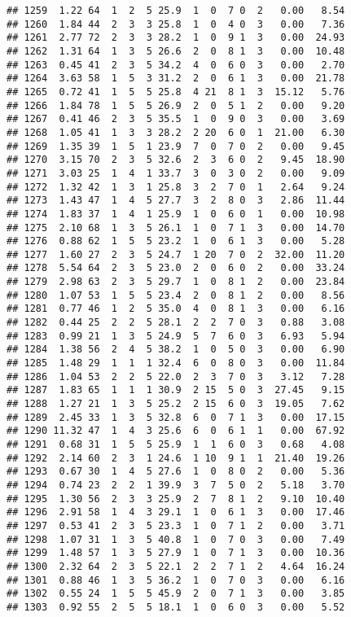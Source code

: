\documentclass[
]{article}
\begin{document}
\begin{verbatim}
## 1259  1.22 64  1  2  5 25.9  1  0  7 0  2   0.00   8.54
## 1260  1.84 44  2  3  3 25.8  1  0  4 0  3   0.00   7.36
## 1261  2.77 72  2  3  3 28.2  1  0  9 1  3   0.00  24.93
## 1262  1.31 64  1  3  5 26.6  2  0  8 1  3   0.00  10.48
## 1263  0.45 41  2  3  5 34.2  4  0  6 0  3   0.00   2.70
## 1264  3.63 58  1  5  3 31.2  2  0  6 1  3   0.00  21.78
## 1265  0.72 41  1  5  5 25.8  4 21  8 1  3  15.12   5.76
## 1266  1.84 78  1  5  5 26.9  2  0  5 1  2   0.00   9.20
## 1267  0.41 46  2  3  5 35.5  1  0  9 0  3   0.00   3.69
## 1268  1.05 41  1  3  3 28.2  2 20  6 0  1  21.00   6.30
## 1269  1.35 39  1  5  1 23.9  7  0  7 0  2   0.00   9.45
## 1270  3.15 70  2  3  5 32.6  2  3  6 0  2   9.45  18.90
## 1271  3.03 25  1  4  1 33.7  3  0  3 0  2   0.00   9.09
## 1272  1.32 42  1  3  1 25.8  3  2  7 0  1   2.64   9.24
## 1273  1.43 47  1  4  5 27.7  3  2  8 0  3   2.86  11.44
## 1274  1.83 37  1  4  1 25.9  1  0  6 0  1   0.00  10.98
## 1275  2.10 68  1  3  5 26.1  1  0  7 1  3   0.00  14.70
## 1276  0.88 62  1  5  5 23.2  1  0  6 1  3   0.00   5.28
## 1277  1.60 27  2  3  5 24.7  1 20  7 0  2  32.00  11.20
## 1278  5.54 64  2  3  5 23.0  2  0  6 0  2   0.00  33.24
## 1279  2.98 63  2  3  5 29.7  1  0  8 1  2   0.00  23.84
## 1280  1.07 53  1  5  5 23.4  2  0  8 1  2   0.00   8.56
## 1281  0.77 46  1  2  5 35.0  4  0  8 1  3   0.00   6.16
## 1282  0.44 25  2  2  5 28.1  2  2  7 0  3   0.88   3.08
## 1283  0.99 21  1  3  5 24.9  5  7  6 0  3   6.93   5.94
## 1284  1.38 56  2  4  5 38.2  1  0  5 0  3   0.00   6.90
## 1285  1.48 29  1  1  1 32.4  6  0  8 0  3   0.00  11.84
## 1286  1.04 53  2  2  5 22.0  2  3  7 0  3   3.12   7.28
## 1287  1.83 65  1  1  1 30.9  2 15  5 0  3  27.45   9.15
## 1288  1.27 21  1  3  5 25.2  2 15  6 0  3  19.05   7.62
## 1289  2.45 33  1  3  5 32.8  6  0  7 1  3   0.00  17.15
## 1290 11.32 47  1  4  3 25.6  6  0  6 1  1   0.00  67.92
## 1291  0.68 31  1  5  5 25.9  1  1  6 0  3   0.68   4.08
## 1292  2.14 60  2  3  1 24.6  1 10  9 1  1  21.40  19.26
## 1293  0.67 30  1  4  5 27.6  1  0  8 0  2   0.00   5.36
## 1294  0.74 23  2  2  1 39.9  3  7  5 0  2   5.18   3.70
## 1295  1.30 56  2  3  3 25.9  2  7  8 1  2   9.10  10.40
## 1296  2.91 58  1  4  3 29.1  1  0  6 1  3   0.00  17.46
## 1297  0.53 41  2  3  5 23.3  1  0  7 1  2   0.00   3.71
## 1298  1.07 31  1  3  5 40.8  1  0  7 0  3   0.00   7.49
## 1299  1.48 57  1  3  5 27.9  1  0  7 1  3   0.00  10.36
## 1300  2.32 64  2  3  5 22.1  2  2  7 1  2   4.64  16.24
## 1301  0.88 46  1  3  5 36.2  1  0  7 0  3   0.00   6.16
## 1302  0.55 24  1  5  5 45.9  2  0  7 1  3   0.00   3.85
## 1303  0.92 55  2  5  5 18.1  1  0  6 0  3   0.00   5.52

\end{verbatim}
\end{document}
